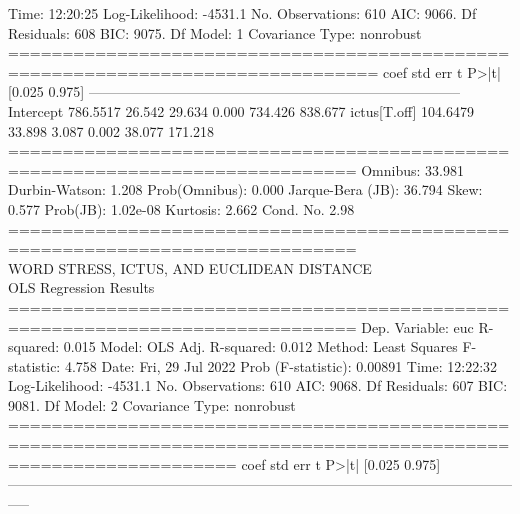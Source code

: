 Time:                        12:20:25   Log-Likelihood:                -4531.1
No. Observations:                 610   AIC:                             9066.
Df Residuals:                     608   BIC:                             9075.
Df Model:                           1                                         
Covariance Type:            nonrobust                                         
================================================================================
                   coef    std err          t      P>|t|      [0.025      0.975]
--------------------------------------------------------------------------------
Intercept      786.5517     26.542     29.634      0.000     734.426     838.677
ictus[T.off]   104.6479     33.898      3.087      0.002      38.077     171.218
==============================================================================
Omnibus:                       33.981   Durbin-Watson:                   1.208
Prob(Omnibus):                  0.000   Jarque-Bera (JB):               36.794
Skew:                           0.577   Prob(JB):                     1.02e-08
Kurtosis:                       2.662   Cond. No.                         2.98
==============================================================================
\\
WORD STRESS, ICTUS, AND EUCLIDEAN DISTANCE \\
  OLS Regression Results   \\                         
==============================================================================
Dep. Variable:                    euc   R-squared:                       0.015
Model:                            OLS   Adj. R-squared:                  0.012
Method:                 Least Squares   F-statistic:                     4.758
Date:                Fri, 29 Jul 2022   Prob (F-statistic):            0.00891
Time:                        12:22:32   Log-Likelihood:                -4531.1
No. Observations:                 610   AIC:                             9068.
Df Residuals:                     607   BIC:                             9081.
Df Model:                           2                                         
Covariance Type:            nonrobust                                         
=================================================================================================================
                                                    coef    std err          t      P>|t|      [0.025      0.975]
-----------------------------------------------------------------------------------------------------------------
